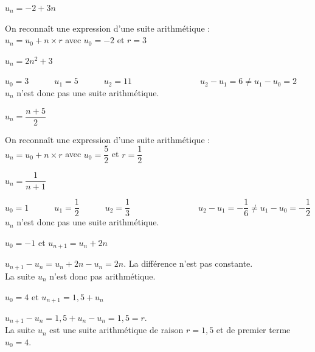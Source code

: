 \documentclass[12pt,a4paper]{article}  %
\begin{document}
\begin{enumMet}
    \item $u_{n}=-2+3 n$ \quad{}\\
    \begin{corrBox}
        On reconnaît une expression d'une suite arithmétique :\\
        $u_n=u_0+n\times r$ avec $u_0=-2$ et $r=3$
    \end{corrBox}
    \item $u_{n}=2 n^{2}+3$ \quad{}\\
    \begin{corrBox}
        $u_0=3\quad\quad\quad u_1=5\quad\quad\quad u_2=11\quad\quad\quad\quad\quad\quad\quad\quad u_2-u_1=6\neq u_1-u_0=2$\\
        $u_n$ n'est donc pas une suite arithmétique.
    \end{corrBox}
    \item $u_{n}=\dfrac{n+5}{2}$ \quad{}\\
    \begin{corrBox}
        On reconnaît une expression d'une suite arithmétique :\\
        $u_n=u_0+n\times r$ avec $u_0=\dfrac{5}{2}$ et $r=\dfrac{1}{2}$
    \end{corrBox}
    \item $u_{n}=\dfrac{1}{n+1}$ \quad{}\\
    \begin{corrBox}
        $u_0=1\quad\quad\quad u_1=\dfrac{1}{2}\quad\quad\quad u_2=\dfrac{1}{3}\quad\quad\quad\quad\quad\quad\quad\quad u_2-u_1=-\dfrac{1}{6}\neq u_1-u_0=-\dfrac{1}{2}$\\
        $u_n$ n'est donc pas une suite arithmétique.
    \end{corrBox}
    \item $u_{0}=-1$ et $u_{n+1}=u_{n}+2 n$ \quad{}\\
    \begin{corrBox}
        $u_{n+1}-u_n=u_n+2 n-u_n=2n$. La différence n'est pas constante.\\
        La suite $u_n$ n'est donc pas arithmétique. 
    \end{corrBox}
    \item $u_{0}=4$ et $u_{n+1}=1,5+u_{n}$ \quad{}\\
    \begin{corrBox}
        $u_{n+1}-u_n=1,5+u_n-u_n=1,5=r$.\\
        La suite $u_n$ est une suite arithmétique de raison $r=1,5$ et de premier terme $u_0=4$. 
    \end{corrBox}
\end{enumMet}
\end{document}
